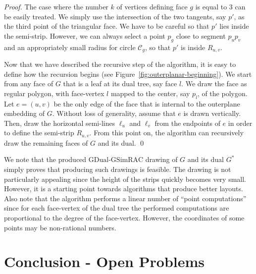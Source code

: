 \documentclass{llncs}
\newcommand{\GDual}{\mathrm{GDual\text{-}GSimRAC}}
\begin{document}
\begin{proof}
The case where the number $k$ of vertices defining face $g$ is equal
to $3$ can be easily treated. We simply use the intersection of the
two tangents, say $p'$, as the third point of the triangular face.
We have to be careful so that $p'$ lies inside the semi-strip.
However, we can always select a point $p_g$ close to segment
$p_up_v$ and an appropriately small radius for circle
$\mathcal{C}_g$, so that $p'$ is inside $R_{u,v}$.


Now that we have described the recursive step of the algorithm, it
is easy to define how the recursion begins (see
Figure~\ref{fig:outerplanar-beginning}). We  start from any face of
$G$ that is a leaf at its dual tree, say face $l$. We draw the face
as regular polygon, with face-vertex $l$ mapped to the center, say
$p_l$, of the polygon. Let $e=(u,v)$ be the only edge of the face
that is internal to the outerplane embedding of $G$. Without loss of
generality, assume that $e$ is drawn vertically. Then, draw the
horizontal semi-lines $\ell_u$ and $\ell_v$ from the endpoints of
$e$ in order to define the semi-strip $R_{u,v}$. From this point on,
the algorithm can recursively draw the remaining faces of $G$ and
its dual. \qed
\end{proof}


We note that the produced $\GDual$ drawing of $G$ and its dual $G^*$
simply proves that producing such drawings is feasible. The drawing
is not particularly appealing since the height of the strips quickly
becomes very small. However, it is a starting point towards
algorithms that produce better layouts. Also note that the algorithm
performs a linear number of ``point computations'' since for each
face-vertex of the dual tree the performed computations are
proportional to the degree of the face-vertex. However, the
coordinates of some points may be non-rational numbers.


\section{Conclusion - Open Problems}
\label{sec:conclusion}
\end{document}
